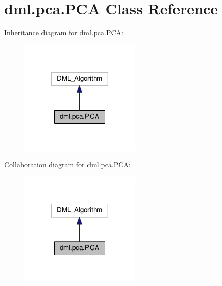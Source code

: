 \hypertarget{classdml_1_1pca_1_1PCA}{}\section{dml.\+pca.\+P\+CA Class Reference}
\label{classdml_1_1pca_1_1PCA}


Inheritance diagram for dml.\+pca.\+P\+CA\+:
\nopagebreak
\begin{figure}[H]
\begin{center}
\leavevmode
\includegraphics[width=164pt]{classdml_1_1pca_1_1PCA__inherit__graph}
\end{center}
\end{figure}


Collaboration diagram for dml.\+pca.\+P\+CA\+:
\nopagebreak
\begin{figure}[H]
\begin{center}
\leavevmode
\includegraphics[width=164pt]{classdml_1_1pca_1_1PCA__coll__graph}
\end{center}
\end{figure}
